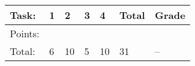 {\begin{tabular}{lllllll}
\hline
 Task:   & 1   & 2   & 3   & 4   & Total   & Grade   \\
\hline
 Points: &     &     &     &     &         &         \\
 Total:  & 6   & 10  & 5   & 10  & 31      & --      \\
\hline
\end{tabular}}